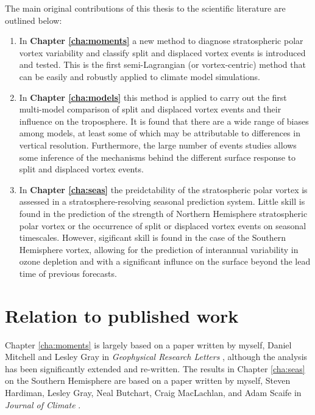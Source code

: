 The main original contributions of this thesis to the scientific literature are
outlined below:
\begin{enumerate}[1.]
\item In \textbf{Chapter \ref{cha:moments}} a new method to diagnose
  stratospheric polar vortex variability and classify split and displaced vortex
  events is introduced and tested. This is the first semi-Lagrangian (or
  vortex-centric) method that can be easily and robustly applied to climate
  model simulations.

\item In \textbf{Chapter \ref{cha:models}} this method is applied to carry out
  the first multi-model comparison of split and displaced vortex events and
  their influence on the troposphere. It is found that there are a wide range of
  biases among models, at least some of which may be attributable to differences
  in vertical resolution. Furthermore, the large number of events studies allows
  some inference of the mechanisms behind the different surface response to
  split and displaced vortex events. 

\item In \textbf{Chapter \ref{cha:seas}} the preidctability of the stratospheric
  polar vortex is assessed in a stratosphere-resolving seasonal prediction
  system. Little skill is found in the prediction of the strength of Northern
  Hemisphere stratospheric polar vortex or the occurrence of split or displaced
  vortex events on seasonal timescales. However, sigificant skill is found in
  the case of the Southern Hemisphere vortex, allowing for the prediction of
  interannual variability in ozone depletion and with a significant influnce on
  the surface beyond the lead time of previous forecasts. 
\end{enumerate}

\section{Relation to published work}
Chapter \ref{cha:moments} is largely based on a paper written by myself, Daniel
Mitchell and Lesley Gray in \emph{Geophysical Research Letters}
\citep{Seviour2013}, although the analysis has been significantly extended and
re-written. The results in Chapter \ref{cha:seas} on the Southern Hemisphere are
based on a paper written by myself, Steven Hardiman, Lesley Gray, Neal Butchart,
Craig MacLachlan, and Adam Scaife in \emph{Journal of Climate}
\citep{Seviour2014}. 

